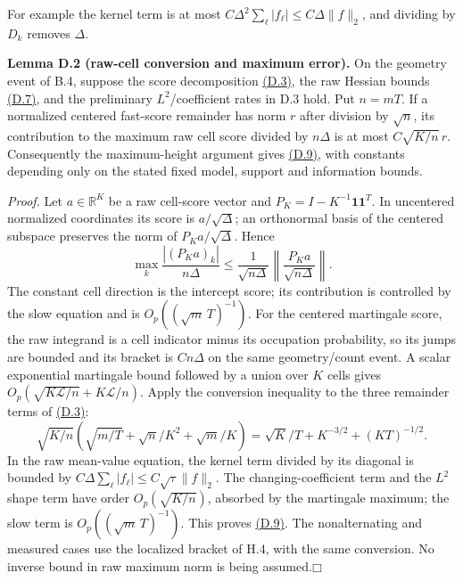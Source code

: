 \documentclass[11pt]{article}
\providecommand{\square}{\mdlgwhtsquare}
\begin{document}
For example the kernel term is at most
\(C\Delta^2\sum_\ell|f_\ell|\leq C\Delta\|f\|_2\), and dividing by \(D_k\) removes \(\Delta\).

\label{res:Lemma-D.2}
\textbf{Lemma D.2 (raw-cell conversion and maximum error).} On the geometry event of B.4, suppose the score decomposition \hyperref[eq:D.3]{(D.3)}, the raw Hessian bounds \hyperref[eq:D.7]{(D.7)}, and the preliminary \(L^2\)/coefficient rates in D.3 hold. Put \(n=mT\). If a normalized centered fast-score remainder has norm \(r\) after division by \(\sqrt n\), its contribution to the maximum raw cell score divided by \(n\Delta\) is at most \(C\sqrt{K/n}\,r\). Consequently the maximum-height argument gives \hyperref[eq:D.9]{(D.9)}, with constants depending only on the stated fixed model, support and information bounds.

\emph{Proof.} Let \(a\in\mathbb R^K\) be a raw cell-score vector and \(P_K=I-K^{-1}\mathbf1\mathbf1^T\). In uncentered normalized coordinates its score is \(a/\sqrt\Delta\); an orthonormal basis of the centered subspace preserves the norm of \(P_Ka/\sqrt\Delta\). Hence
\begin{equation*}
\max_k\frac{|(P_Ka)_k|}{n\Delta}
 \le \frac{1}{\sqrt{n\Delta}}
       \left\|\frac{P_Ka}{\sqrt{n\Delta}}\right\|.
\end{equation*}
The constant cell direction is the intercept score; its contribution is controlled by the slow equation and is \(O_p((\sqrt m\,T)^{-1})\). For the centered martingale score, the raw integrand is a cell indicator minus its occupation probability, so its jumps are bounded and its bracket is \(Cn\Delta\) on the same geometry/count event. A scalar exponential martingale bound followed by a union over \(K\) cells gives
\(O_p(\sqrt{K\mathscr L/n}+K\mathscr L/n)\).
Apply the conversion inequality to the three remainder terms of \hyperref[eq:D.3]{(D.3)}:
\begin{equation*}
\sqrt{K/n}\left(\sqrt{m/T}+\sqrt n/K^2+\sqrt m/K\right)
 =\sqrt K/T+K^{-3/2}+(KT)^{-1/2}.
\end{equation*}
In the raw mean-value equation, the kernel term divided by its diagonal is bounded by
\(C\Delta\sum_\ell |f_\ell|\le C\sqrt\tau\|f\|_2\).
The changing-coefficient term and the \(L^2\) shape term have order \(O_p(\sqrt{K/n})\), absorbed by the martingale maximum; the slow term is \(O_p((\sqrt m\,T)^{-1})\). This proves \hyperref[eq:D.9]{(D.9)}. The nonalternating and measured cases use the localized bracket of H.4, with the same conversion. No inverse bound in raw maximum norm is being assumed.\hfill$\square$
\end{document}
